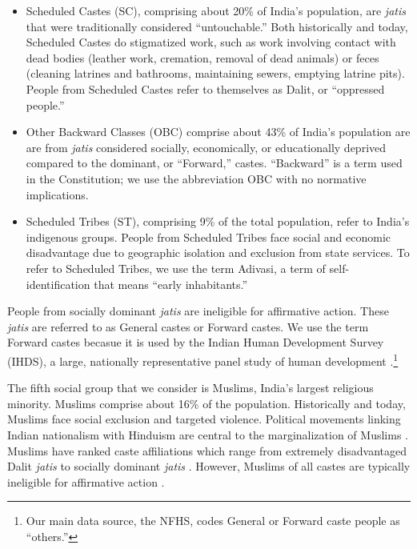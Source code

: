 \documentclass[12pt]{article}
\begin{document}
\begin{itemize}
\item Scheduled Castes (SC), comprising about 20\% of India's population, are \textit{jatis} that were traditionally considered ``untouchable.''  Both historically and today, Scheduled Castes do stigmatized work, such as work involving contact with dead bodies (leather work, cremation, removal of dead animals) or feces (cleaning latrines and bathrooms, maintaining sewers, emptying latrine pits).  People from Scheduled Castes refer to themselves as Dalit, or ``oppressed people.''  
\item Other Backward Classes (OBC) comprise about 43\% of India's population are are from \textit{jatis} considered socially, economically, or educationally deprived compared to the dominant, or ``Forward,'' castes.  ``Backward'' is a term used in the Constitution; we use the abbreviation OBC with no normative implications. 
\item Scheduled Tribes (ST), comprising 9\% of the total population, refer to India’s indigenous groups.  People from Scheduled Tribes face social and economic disadvantage due to geographic isolation and exclusion from state services.  To refer to Scheduled Tribes, we use the term Adivasi, a term of self-identification that means ``early inhabitants.''  
\end{itemize}

People from socially dominant \textit{jatis} are ineligible for affirmative action.  These \textit{jatis} are referred to as General castes or Forward castes.  We use the term Forward castes becasue it is used by the Indian Human Development Survey (IHDS), a large, nationally representative panel study of human development \citep{DesaiVannemanIHDS2011}.\footnote{Our main data source, the NFHS, codes General or Forward caste people as ``others.''}  

The fifth social group that we consider is Muslims, India's largest religious minority.  Muslims comprise about 16\% of the population.  Historically and today, Muslims face social exclusion and targeted violence.  Political movements linking Indian nationalism with Hinduism are central to the marginalization of Muslims \citep{farooqui2020political}. Muslims have ranked caste affiliations which range from extremely disadvantaged Dalit \textit{jatis} to socially dominant \textit{jatis} \citep{ahmad2007recognition}.  However, Muslims of all castes are typically ineligible for affirmative action \citep{hasan2018muslims, hasan2022wider}.   
\end{document}
